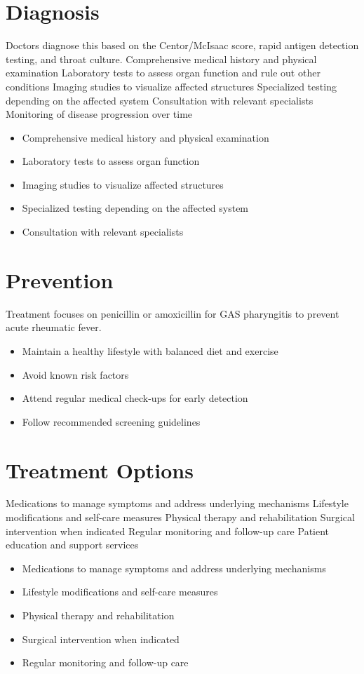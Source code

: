 \section{Diagnosis}
Doctors diagnose this based on the Centor/McIsaac score, rapid antigen detection testing, and throat culture. Comprehensive medical history and physical examination Laboratory tests to assess organ function and rule out other conditions Imaging studies to visualize affected structures Specialized testing depending on the affected system Consultation with relevant specialists Monitoring of disease progression over time

\begin{itemize}[noitemsep]
  \item Comprehensive medical history and physical examination
  \item Laboratory tests to assess organ function
  \item Imaging studies to visualize affected structures
  \item Specialized testing depending on the affected system
  \item Consultation with relevant specialists
\end{itemize}
\section{Prevention}
Treatment focuses on penicillin or amoxicillin for GAS pharyngitis to prevent acute rheumatic fever.

\begin{itemize}[noitemsep]
  \item Maintain a healthy lifestyle with balanced diet and exercise
  \item Avoid known risk factors
  \item Attend regular medical check-ups for early detection
  \item Follow recommended screening guidelines
\end{itemize}
\section{Treatment Options}
Medications to manage symptoms and address underlying mechanisms Lifestyle modifications and self-care measures Physical therapy and rehabilitation Surgical intervention when indicated Regular monitoring and follow-up care Patient education and support services

\begin{itemize}[noitemsep]
  \item Medications to manage symptoms and address underlying mechanisms
  \item Lifestyle modifications and self-care measures
  \item Physical therapy and rehabilitation
  \item Surgical intervention when indicated
  \item Regular monitoring and follow-up care
\end{itemize}
